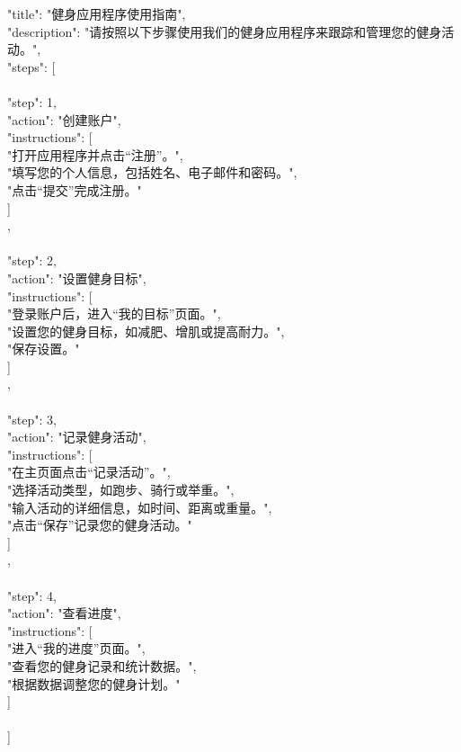 \documentclass[12pt]{book}
\begin{document}
\begin{tcolorbox}
{
	"title": "健身应用程序使用指南",\\
	"description": "请按照以下步骤使用我们的健身应用程序来跟踪和管理您的健身活动。",\\
	"steps": [\\
	{\\
		"step": 1,\\
		"action": "创建账户",\\
		"instructions": [\\
		"打开应用程序并点击“注册”。",\\
		"填写您的个人信息，包括姓名、电子邮件和密码。",\\
		"点击“提交”完成注册。"\\
		]\\
	},\\
	{\\
		"step": 2,\\
		"action": "设置健身目标",\\
		"instructions": [\\
		"登录账户后，进入“我的目标”页面。",\\
		"设置您的健身目标，如减肥、增肌或提高耐力。",\\
		"保存设置。"\\
		]\\
	},\\
	{\\
		"step": 3,\\
		"action": "记录健身活动",\\
		"instructions": [\\
		"在主页面点击“记录活动”。",\\
		"选择活动类型，如跑步、骑行或举重。",\\
		"输入活动的详细信息，如时间、距离或重量。",\\
		"点击“保存”记录您的健身活动。"\\
		]\\
	},\\
	{\\
		"step": 4,\\
		"action": "查看进度",\\
		"instructions": [\\
		"进入“我的进度”页面。",\\
		"查看您的健身记录和统计数据。",\\
		"根据数据调整您的健身计划。"\\
		]\\
	}\\
	]\\
}\\

\end{tcolorbox}	
\end{document}
